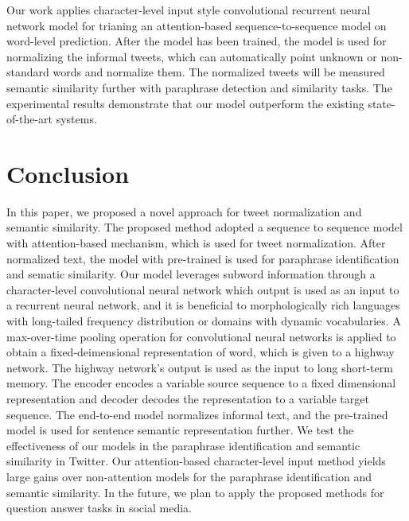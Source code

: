 \documentclass[letterpaper]{article}
\begin{document}
Our work applies character-level input style convolutional recurrent neural network model for trianing an attention-based sequence-to-sequence model on word-level prediction. After the model has been trained, the model is used for normalizing the informal tweets, which can automatically point unknown or non-standard words and normalize them. The normalized tweets will be measured semantic similarity further with paraphrase detection and similarity tasks. The experimental results demonstrate that our model outperform the existing state-of-the-art systems.

\section{Conclusion}
In this paper, we proposed a novel approach for tweet normalization and semantic similarity. The proposed method adopted a sequence to sequence model with attention-based mechanism, which is used for tweet normalization. After normalized text, the model with pre-trained is used for paraphrase identification and sematic similarity. Our model leverages subword information through a character-level convolutional neural network which output is used as an input to a recurrent neural network, and it is beneficial to morphologically rich languages with long-tailed frequency distribution or domains with dynamic vocabularies. A max-over-time pooling operation for convolutional neural networks is applied to obtain a fixed-deimensional representation of word, which is given to a highway network. The highway network's output is used as the input to long short-term memory. The encoder encodes a variable source sequence to a fixed dimensional representation and decoder decodes the representation to a variable target sequence. The end-to-end model normalizes informal text, and the pre-trained model is used for sentence semantic representation further. We test the effectiveness of our models in the paraphrase identification and semantic similarity in Twitter. Our attention-based character-level input method yields large gains over non-attention models for the paraphrase identification and semantic similarity. In the future, we plan to apply the proposed methods for question answer tasks in social media.



\end{document}
